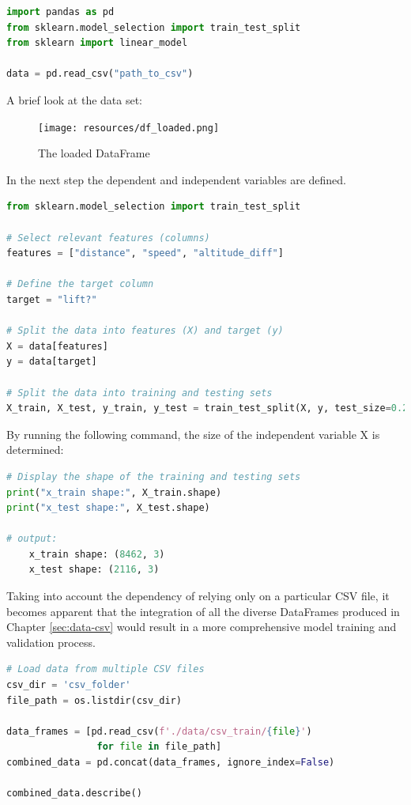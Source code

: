 \begin{lstlisting}[language=Python]
import pandas as pd
from sklearn.model_selection import train_test_split
from sklearn import linear_model

data = pd.read_csv("path_to_csv")
\end{lstlisting}

A brief look at the data set:
\begin{figure}[htb]
	\texttt{[image: resources/df\_loaded.png]}
	\caption{The loaded DataFrame}
	\label{fig:df}
\end{figure}

In the next step the dependent and independent variables are defined.

\begin{lstlisting}[language=Python]
from sklearn.model_selection import train_test_split

# Select relevant features (columns)
features = ["distance", "speed", "altitude_diff"]

# Define the target column
target = "lift?"

# Split the data into features (X) and target (y)
X = data[features]
y = data[target]

# Split the data into training and testing sets
X_train, X_test, y_train, y_test = train_test_split(X, y, test_size=0.2, random_state=42)
\end{lstlisting}

By running the following command, the size of the independent variable X is determined:

\begin{lstlisting}[language=Python]
# Display the shape of the training and testing sets
print("x_train shape:", X_train.shape)
print("x_test shape:", X_test.shape)

# output:
	x_train shape: (8462, 3)
	x_test shape: (2116, 3)
\end{lstlisting}


Taking into account the dependency of relying only on a particular CSV file, it becomes apparent that the integration of all the diverse DataFrames produced in Chapter \ref{sec:data-csv} would result in a more comprehensive model training and validation process.

\begin{lstlisting}[language=Python]
# Load data from multiple CSV files
csv_dir = 'csv_folder'
file_path = os.listdir(csv_dir)

data_frames = [pd.read_csv(f'./data/csv_train/{file}')
                for file in file_path]
combined_data = pd.concat(data_frames, ignore_index=False)

combined_data.describe()
\end{lstlisting}

